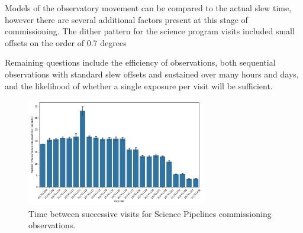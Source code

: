 Models of the observatory movement can be compared to the actual slew time, however there are several additional factors present at this stage of commissioning. The dither pattern for the science program visits included small offsets on the order of 0.7 degrees 


Remaining questions include the efficiency of observations, both sequential observations with standard slew offsets and sustained over many hours and days, and the likelihood of whether a single exposure per visit will be sufficient.

\begin{figure}
    \centering
    \includegraphics[width=0.7\textwidth]{sp/timeBetweenExposures20241208.png}
    \caption{Time between successive visits for Science Pipelines commissioning observations.}
    \label{fig:time_between_visits}
\end{figure}